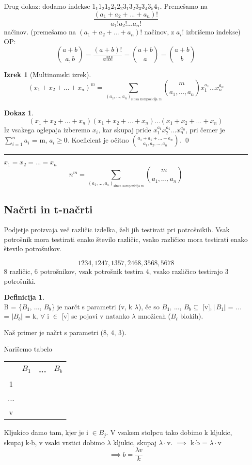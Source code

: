 \documentclass[a4paper,12pt]{article}
\theoremstyle{definition}
\newtheorem{defn}[counter]{Definicija}
\newtheorem{theorem}[counter]{Izrek}
\newtheorem{pro}[counter]{Dokaz}
\theoremstyle{remark}
\begin{document}
Drug dokaz: dodamo indekse $1_1 1_2 1_3 2_1 2_2 3_1 3_2 3_3 3_4 3_5 4_1$. Premešamo na
\[\frac{(a_1 + a_2 + ... + a_n)!}{a_1!a_2!...a_n!}\]
načinov. (premešamo na $(a_1 + a_2 + ... + a_n)!$ načinov, z $a_i!$ izbrišemo indekse)\\
OP:
\[\binom{a+b}{a, b} = \frac{(a+b)!}{a!b!} = \binom{a+b}{a} = \binom{a+b}{b}\]

\begin{theorem}[Multinomski izrek]
\[(x_1 + x_2 + ... + x_n)^m = \sum_{(a_1, ..., a_n)_{\text{šibka kompozicija m}}} \binom{m}{a_1, ..., a_n} x_1^{a_1}...x_n^{a_n}\]
\end{theorem}

\begin{pro}
\[(x_1 + x_2 + ... + x_n)(x_1 + x_2 + ... + x_n)...(x_1 + x_2 + ... + x_n)\]
Iz vsakega oglepaja izberemo $x_i$, kar skupaj pride $x_1^{a_1} x_2^{a_2}...x_n^{a_n}$, pri čemer je $\displaystyle \sum_{i = 1}^n a_i$ = m, $a_i \geqslant 0$. Koeficient je očitno $\binom{a_1 + a_2 + ... + a_n}{a_1, a_2, ..., a_n}$.
\qed
\end{pro}
\hrule
$x_1 = x_2 = ... = x_n$
\[n^m = \sum_{(a_1, ..., a_n)_{\text{šibka kompozicija m}}} \binom{m}{a_1, ..., a_n}\]


\subsection{Načrti in t-načrti}
Podjetje proizvaja več različic izdelka, želi jih testirati pri potrošnikih. Vsak potrošnik mora testirati enako število različic, vsako različico mora testirati enako število potrošnikov.

\[1234, 1247, 1357, 2468, 3568, 5678\]
8 različic, 6 potrošnikov, vsak potrošnik testira 4, vsako različico testirajo 3 potrošniki.

\begin{defn}\mbox{}\\
B = \{$B_1$, ..., $B_b$\} je narčt s parametri (v, k $\lambda$), če so $B_1$, ..., $B_b \subseteq$ [v], $|B_1|$ = ... = $|B_b|$ = k, $\forall$ i $\in$ [v] se pojavi v natanko $\lambda$ množicah ($B_i$ blokih).
\end{defn}

Naš primer je načrt s parametri (8, 4, 3).

Narišemo tabelo
\begin{tabular}{c|c c c}
     & $B_1$ & ... & $B_b$ \\
\hline
     1 \\
     ...\\
     v
\end{tabular}
Kljukico damo tam, kjer je i $\in B_j$. V vsakem stolpcu tako dobimo k kljukic, skupaj k$\cdot$b, v vsaki vrstici dobimo $\lambda$ kljukic, skupaj $\lambda \cdot$v. $\implies$ k$\cdot$b = $\lambda \cdot$v
\[\implies b = \frac{\lambda v}{k}\]
\end{document}
